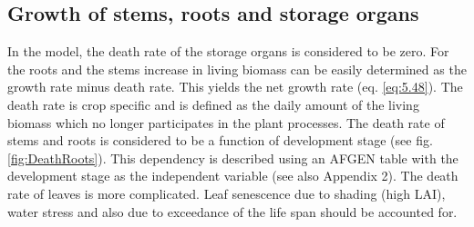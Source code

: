 %
%

\subsection{Growth of stems, roots and storage organs}

In the model, the death rate of the storage organs is considered to be zero. For the roots
and the stems increase in living biomass can be easily determined as the growth rate
minus death rate. This yields the net growth rate (eq. \ref{eq:5.48}). The death rate is crop
specific and is defined as the daily amount of the living biomass which no longer
participates in the plant processes. The death rate of stems and roots is considered to be a
function of development stage (see fig. \ref{fig:DeathRoots}). This dependency is described using an
AFGEN table with the development stage as the independent variable (see also Appendix
2). The death rate of leaves is more complicated. Leaf senescence due to shading (high
LAI), water stress and also due to exceedance of the life span should be accounted for.


